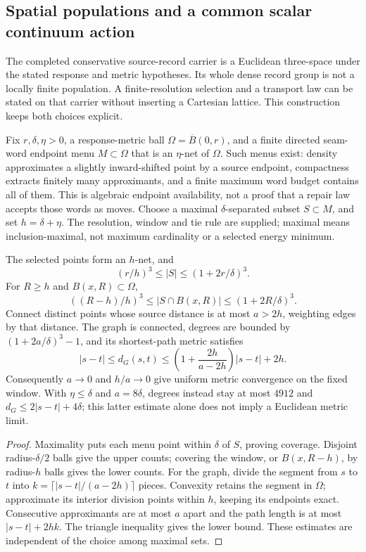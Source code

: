 \subsection{Spatial populations and a common scalar continuum action}
\label{sec:source-metric-scalar-continuum}

The completed conservative source-record carrier is a Euclidean
three-space under the stated response and metric hypotheses. Its whole
dense record group is not a locally finite population. A finite-resolution
selection and a transport law can be stated on that carrier without
inserting a Cartesian lattice. This construction keeps both choices explicit.

Fix $r,\delta,\eta>0$, a response-metric ball $\Omega=\overline B(0,r)$,
and a finite directed
seam-word endpoint menu $M\subset\Omega$ that is an $\eta$-net of $\Omega$.
Such menus exist: density approximates a slightly inward-shifted point by
a source endpoint, compactness extracts finitely many approximants, and a
finite maximum word budget contains all of them. This is algebraic endpoint
availability, not a proof that a repair law accepts those words as moves.
Choose a maximal $\delta$-separated subset $S\subset M$, and set
$h=\delta+\eta$. The resolution, window and tie rule are supplied; maximal
means inclusion-maximal, not maximum cardinality or a selected energy minimum.

\begin{proposition}
\label{prop:source-metric-population}
The selected points form an $h$-net, and
\[
 (r/h)^3\le |S|\le(1+2r/\delta)^3.
\]
For $R\ge h$ and $B(x,R)\subset\Omega$,
\[
 ((R-h)/h)^3\le |S\cap B(x,R)|\le(1+2R/\delta)^3.
\]
Connect distinct points whose source distance is at most $a>2h$, weighting
edges by that distance. The graph is connected, degrees are bounded by
$(1+2a/\delta)^3-1$, and its shortest-path metric satisfies
\[
 |s-t|\le d_G(s,t)\le
 \left(1+\frac{2h}{a-2h}\right)|s-t|+2h.
\]
Consequently $a\to0$ and $h/a\to0$ give uniform metric convergence on the
fixed window. With $\eta\le\delta$ and $a=8\delta$, degrees instead stay
at most $4912$ and $d_G\le2|s-t|+4\delta$; this latter estimate alone
does not imply a Euclidean metric limit.
\end{proposition}
\begin{proof}
Maximality puts each menu point within $\delta$ of $S$, proving coverage.
Disjoint radius-$\delta/2$ balls give the upper counts; covering the window,
or $B(x,R-h)$, by radius-$h$ balls gives the lower counts. For the graph,
divide the segment from $s$ to $t$ into
$k=\lceil |s-t|/(a-2h)\rceil$ pieces. Convexity retains the segment in
$\Omega$; approximate its interior division points within $h$, keeping its
endpoints exact. Consecutive approximants are at most $a$ apart and the
path length is at most $|s-t|+2hk$. The triangle inequality gives the lower
bound. These estimates are independent of the choice among maximal sets.
\end{proof}

